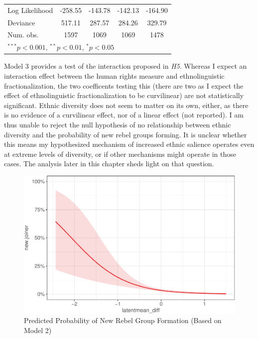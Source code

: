 \documentclass[12pt,]{book}
\let\origtable\table
\let\endorigtable\endtable
\renewenvironment{table}[1][2] {
    \singlespacing
    \expandafter\origtable\expandafter[H]
} {
    \endorigtable
}
\theoremstyle{definition}
\theoremstyle{definition}
\theoremstyle{remark}
\begin{document}
\begin{table}
\begin{center}
\begin{tabular}{l c c c c }
Log Likelihood                          & -258.55       & -143.78      & -142.13    & -164.90      \\
Deviance                                & 517.11        & 287.57       & 284.26     & 329.79       \\
Num. obs.                               & 1597          & 1069         & 1069       & 1478         \\
\hline
\multicolumn{5}{l}{\scriptsize{$^{***}p<0.001$, $^{**}p<0.01$, $^*p<0.05$}}
\end{tabular}
\caption{Logit Models of Rebel Group Formation}
\label{tab:entry}
\end{center}
\end{table}

Model 3 provides a test of the interaction proposed in \emph{H5}.
Whereas I expect an interaction effect between the human rights measure
and ethnolinguistic fractionalization, the two coefficents testing this
(there are two as I expect the effect of ethnolinguistic
fractionalization to be curvilinear) are not statistically significant.
Ethnic diversity does not seem to matter on its own, either, as there is
no evidence of a curvilinear effect, nor of a linear effect (not
reported). I am thus unable to reject the null hypothesis of no
relationship between ethnic diversity and the probability of new rebel
groups forming. It is unclear whether this means my hypothesized
mechanism of increased ethnic salience operates even at extreme levels
of diversity, or if other mechanisms might operate in those cases. The
analysis later in this chapter sheds light on that question.

\begin{figure}
\centering
\includegraphics{entry_standalone_files/figure-latex/effectplot-1.pdf}
\caption{\label{fig:effectplot}Predicted Probability of New Rebel Group
Formation (Based on Model 2)}
\end{figure}
\end{document}
